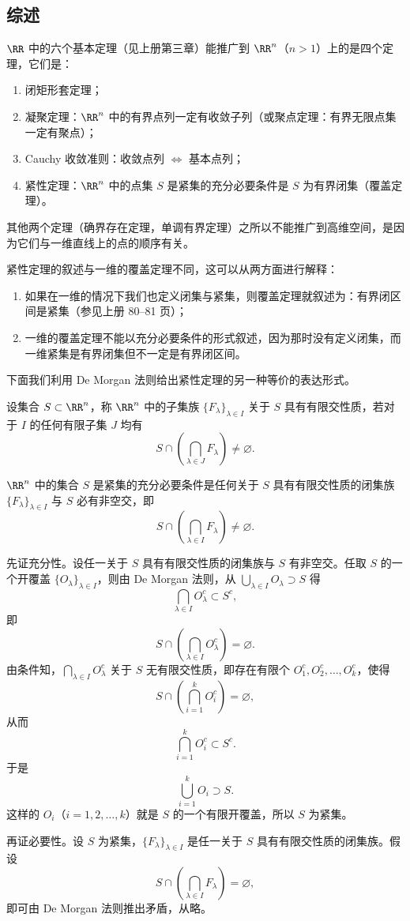\subsection{综述}

$\RR$ 中的六个基本定理（见上册第三章）能推广到 $\RR^n$（$n>1$）上的是四个定理，它们是：
\begin{enumerate}[label=(\arabic*)]
  \item 闭矩形套定理；
  \item 凝聚定理：$\RR^n$ 中的有界点列一定有收敛子列（或聚点定理：有界无限点集一定有聚点）；
  \item Cauchy 收敛准则：收敛点列 $\Longleftrightarrow$ 基本点列；
  \item 紧性定理：$\RR^n$ 中的点集 $S$ 是紧集的充分必要条件是 $S$ 为有界闭集（覆盖定理）。
\end{enumerate}
其他两个定理（确界存在定理，单调有界定理）之所以不能推广到高维空间，是因为它们与一维直线上的点的顺序有关。

紧性定理的叙述与一维的覆盖定理不同，这可以从两方面进行解释：
\begin{enumerate}[label=(\arabic*)]
  \item 如果在一维的情况下我们也定义闭集与紧集，则覆盖定理就叙述为：有界闭区间是紧集（参见上册 80--81 页）；
  \item 一维的覆盖定理不能以充分必要条件的形式叙述，因为那时没有定义闭集，而一维紧集是有界闭集但不一定是有界闭区间。
\end{enumerate}
下面我们利用 De Morgan 法则给出紧性定理的另一种等价的表达形式。

\begin{xdefinition}
设集合 $S\subset\RR^n$，称 $\RR^n$ 中的子集族 $\{F_\lambda\}_{\lambda\in I}$ 关于 $S$ 具有有限交性质，若对于 $I$ 的任何有限子集 $J$ 均有
\[
  S\cap\left(\bigcap_{\lambda\in J}F_\lambda\right)\neq\varnothing.
\]
\end{xdefinition}

\begin{xproposition}[17.2.1]
$\RR^n$ 中的集合 $S$ 是紧集的充分必要条件是任何关于 $S$ 具有有限交性质的闭集族 $\{F_\lambda\}_{\lambda\in I}$ 与 $S$ 必有非空交，即
\[
  S\cap\left(\bigcap_{\lambda\in I}F_\lambda\right)\neq\varnothing.
\]
\end{xproposition}
\begin{xproof}
先证充分性。设任一关于 $S$ 具有有限交性质的闭集族与 $S$ 有非空交。任取 $S$ 的一个开覆盖 $\{O_\lambda\}_{\lambda\in I}$，则由 De Morgan 法则，从 $\bigcup_{\lambda\in I}O_\lambda\supset S$ 得
\[
  \bigcap_{\lambda\in I}O_\lambda^c\subset S^c,
\]
即
\[
  S\cap\left(\bigcap_{\lambda\in I}O_\lambda^c\right)=\varnothing.
\]
由条件知，$\bigcap_{\lambda\in I}O_\lambda^c$ 关于 $S$ 无有限交性质，即存在有限个 $O_1^c,O_2^c,\ldots,O_k^c$，使得
\[
  S\cap\left(\bigcap_{i=1}^kO_i^c\right)=\varnothing,
\]
从而
\[
  \bigcap_{i=1}^kO_i^c\subset S^c.
\]
于是
\[
  \bigcup_{i=1}^kO_i\supset S.
\]
这样的 $O_i$（$i=1,2,\ldots,k$）就是 $S$ 的一个有限开覆盖，所以 $S$ 为紧集。

再证必要性。设 $S$ 为紧集，$\{F_\lambda\}_{\lambda\in I}$ 是任一关于 $S$ 具有有限交性质的闭集族。假设
\[
  S\cap\left(\bigcap_{\lambda\in I}F_\lambda\right)=\varnothing,
\]
即可由 De Morgan 法则推出矛盾，从略。
\end{xproof}

